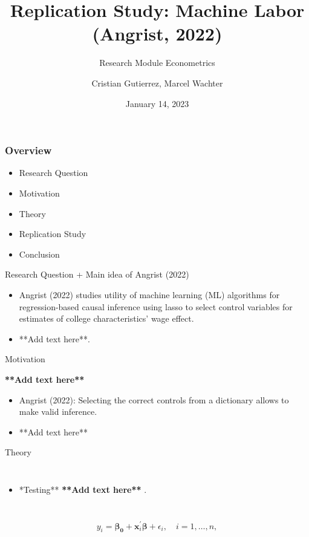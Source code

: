 \documentclass{beamer}
\title{Replication Study: Machine Labor (Angrist, 2022)}
\subtitle {Research Module Econometrics}
\author{Cristian Gutierrez, Marcel Wachter}
\date{January 14, 2023}
\begin{document}
\maketitle

\begin{frame}
\frametitle{Overview} 

\begin{itemize}
    

\item Research Question
\item Motivation
\item Theory
\item Replication Study
\item Conclusion
\end{itemize}
\end{frame}


\begin{frame} {Research Question + Main idea of Angrist (2022)}
\begin{itemize}

\item  Angrist (2022) studies utility of machine learning (ML) algorithms for regression-based causal inference using lasso to select control variables for estimates of college characteristics' wage effect.
\item **Add text here**.
\end{itemize}

\end{frame}






\begin{frame}{Motivation}

\flushleft \textbf{**Add text here**}
\vspace{4mm}
\begin{itemize}
    \item Angrist (2022): Selecting the correct controls from a dictionary allows to make valid inference.
    \item **Add text here**
\end{itemize}

\end{frame}


\begin{frame}{Theory}
\begin{columns}

\begin{itemize}
\item \centering **Testing** \textbf{**Add text here**} . 
\end{itemize}


\end{columns}


\[
    y_i=\boldsymbol{\beta_0} +\mathbf{x}_i^\prime \boldsymbol{\beta}+\epsilon_i, \quad i = 1, \ldots, n,
    \tag{1}
\]

\end{frame}
\end{document}
